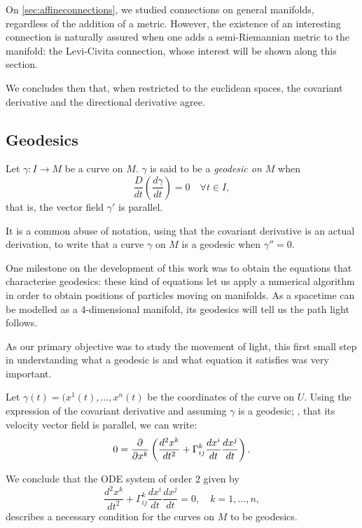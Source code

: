On \autoref{sec:affineconnections}, we studied connections on general manifolds, regardless of the addition of a metric. However, the existence of an interesting connection is naturally assured when one adds a semi-Riemannian metric to the manifold: the Levi-Civita connection, whose interest will be shown along this section.

We concludes then that, when restricted to the euclidean spaces, the covariant derivative and the directional derivative agree.

\subsection{Geodesics}

\begin{definition}[Geodesic]
	Let $\gamma \colon I \to M$ be a curve on $M$. $\gamma$ is said to be a \emph{geodesic on $M$} when
	\[
	\frac{D}{dt}\left(\frac{d\gamma}{dt}\right) = 0 \quad \forall t \in I,
	\]
	that is, the vector field $\gamma'$ is parallel.
\end{definition}

It is a common abuse of notation, using that the covariant derivative is an actual derivation, to write that a curve $\gamma$ on $M$ is a geodesic when $\gamma'' = 0$.

One milestone on the development of this work was to obtain the equations that characterise geodesics: these kind of equations let us apply a numerical algorithm in order to obtain positions of particles moving on manifolds. As a spacetime can be modelled as a 4-dimensional manifold, its geodesics will tell us the path light follows.

As our primary objective was to study the movement of light, this first small step in understanding what a geodesic is and what equation it satisfies was very important.

\begin{remark}
	
	Let $\gamma(t) = (x^1(t), \dots, x^n(t)$ be the coordinates of the curve on $U$. Using the expression of the covariant derivative and assuming $\gamma$ is a geodesic; \ie, that its velocity vector field is parallel, we can write:
	\[
	0 = \frac{\partial^{} }{\partial x^k} \left( \frac{d^2x^k}{dt^2} + \Gamma^k_{ij} \frac{d x^i}{dt} \frac{d x^j}{dt} \right).
	\]
	
	We conclude that the \ac{ODE} system of order 2 given by
	\begin{equation}
	\label{eq:geodesic}
	\frac{d^2x^k}{dt^2} + \Gamma^k_{ij} \frac{d x^i}{dt} \frac{d x^j}{dt} = 0, \quad k = 1, \dots, n,
	\end{equation}
	describes a necessary condition for the curves on $M$ to be geodesics.
\end{remark}

